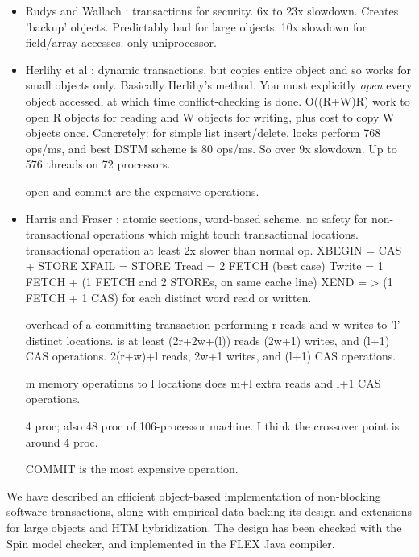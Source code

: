 \documentclass{csa-sig-alternate}
\begin{document}
{\begin{itemize}
  64 processors; no numbers presented for less than 10 processors.

  acquire/release/agree are expensive.

\item Rudys and Wallach \cite{RudysWa02}: transactions for security.
  6x to 23x slowdown.  Creates 'backup' objects.  Predictably bad
  for large objects.  10x slowdown for field/array accesses.
  only uniprocessor.

\item Herlihy et al \cite{HerlihyLuMoSc03}: dynamic transactions, but
  copies entire object and so works for small objects only.  Basically
  Herlihy's method.  You must explicitly \emph{open} every object
  accessed, at which time conflict-checking is done.
  O((R+W)R) work to open R objects for reading and W objects for
  writing, plus cost to copy W objects once.  Concretely: for simple
  list insert/delete, locks perform 768 ops/ms, and best DSTM scheme
  is 80 ops/ms.   So over 9x slowdown.
  Up to 576 threads on 72 processors.

  open and commit are the expensive operations.
\item Harris and Fraser \cite{HarrisFr03}: atomic sections, word-based
  scheme.  no safety for non-transactional operations which might
  touch transactional locations.  transactional operation at least 2x
  slower than normal op.
  XBEGIN = CAS + STORE
  XFAIL = STORE
  Tread = 2 FETCH (best case)
  Twrite = 1 FETCH + (1 FETCH and 2 STOREs, on same cache line)
  XEND = > (1 FETCH + 1 CAS) for each distinct word read or written.

  overhead of a committing transaction performing r reads and w writes
  to 'l' distinct locations.
  is at least (2r+2w+(l)) reads (2w+1) writes, and (l+1) CAS
  operations.  2(r+w)+l reads, 2w+1 writes, and (l+1) CAS operations.

m memory operations to l locations does m+l extra reads and l+1 CAS operations.

  4 proc; also 48 proc of 106-processor machine.  I think the
  crossover point is around 4 proc.

  COMMIT is the most expensive operation.
\end{itemize}
}


We have described an efficient object-based implementation of
non-blocking software transactions, along with empirical data backing
its design and extensions for large objects and HTM hybridization.
The design has been checked with the Spin model checker, and
implemented in the FLEX Java compiler.
\end{document}
